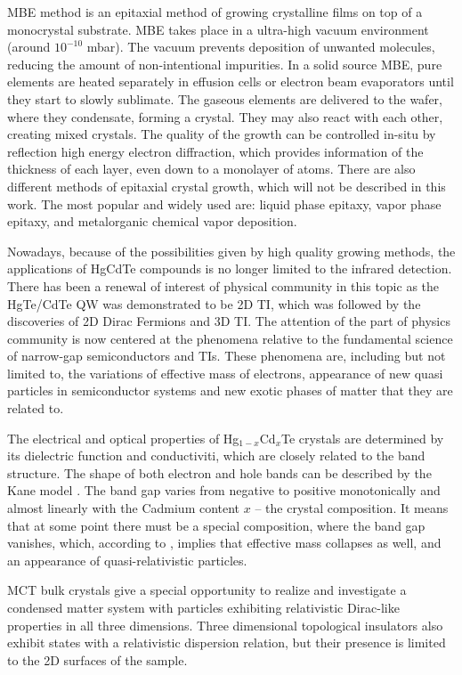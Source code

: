 \documentclass[titlepage,a4paper]{book}
\begin{document}
MBE method is an epitaxial method of growing crystalline films on top of a monocrystal substrate. MBE takes place in a ultra-high vacuum environment (around $10^{-10}$ mbar). The vacuum prevents deposition of unwanted molecules, reducing the amount of non-intentional impurities. In a solid source MBE, pure elements are heated separately in effusion cells or electron beam evaporators until they start to slowly sublimate. The gaseous elements are delivered to the wafer, where they condensate, forming a crystal. They may also react with each other, creating mixed crystals. The quality of the growth can be controlled in-situ by reflection high energy electron diffraction, which provides information of the thickness of each layer, even down to a monolayer of atoms. There are also different methods of epitaxial crystal growth, which will not be described in this work. The most popular and widely used are: liquid phase epitaxy, vapor phase epitaxy, and metalorganic chemical vapor deposition.

Nowadays, because of the possibilities given by high quality growing methods, the applications of HgCdTe compounds is no longer limited to the infrared detection. There has been a renewal of interest of physical community in this topic as the HgTe/CdTe QW was demonstrated to be 2D TI, which was followed by the discoveries of 2D Dirac Fermions and 3D TI. The attention of the part of physics community is now centered at the phenomena relative to the fundamental science of narrow-gap semiconductors and TIs. These phenomena are, including but not limited to, the variations of effective mass of electrons, appearance of new quasi particles in semiconductor systems and new exotic phases of matter that they are related to. 

The electrical and optical properties of Hg$_{1-x}$Cd$_x$Te crystals are determined by its dielectric function and conductiviti, which are closely related to the band structure. The shape of both electron and hole bands can be described by the Kane model \cite{Kane_Model}. The band gap varies from negative to positive monotonically and almost linearly with the Cadmium content $x$ -- the crystal composition. It means that at some point there must be a special composition, where the band gap vanishes, which, according to \cite{Zawadzki_Topology}, implies that effective mass collapses as well, and an appearance of quasi-relativistic particles. 

MCT bulk crystals give a special opportunity to realize and investigate a condensed matter system with particles exhibiting relativistic Dirac-like properties in all three dimensions. Three dimensional topological insulators also exhibit states with a relativistic dispersion relation, but their presence is limited to the 2D surfaces of the sample.
\end{document}
